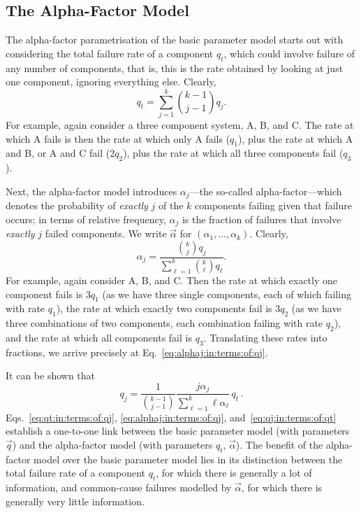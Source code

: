 \subsection{The Alpha-Factor Model}
\label{sec:alpha-factor-model}

The alpha-factor parametrisation of the basic parameter model
\parencite{1988:mosleh::common:cause} starts out with
considering the total failure rate of a component $q_t$,
which could involve failure of any number of components,
that is, this is the rate obtained by looking at just one component,
ignoring everything else.
Clearly,
\begin{equation}\label{eq:qt:in:terms:of:qj}
  q_t=\sum_{j=1}^k\binom{k-1}{j-1}q_j.
\end{equation}
For example, again consider a three component system, A, B, and C.
The rate at which A fails is then
the rate at which only A fails ($q_1$),
plus the rate at which A and B, or A and C fail ($2q_2$),
plus the rate at which all three components fail ($q_3$).

Next, the alpha-factor model introduces
$\alpha_j$---the so-called alpha-factor---which
denotes the probability of \emph{exactly} $j$ of the $k$ components
failing given that failure occurs;
in terms of relative frequency,
$\alpha_j$ is the fraction of failures
that involve \emph{exactly} $j$ failed components.
We write $\vec{\alpha}$ for $(\alpha_1,\dots,\alpha_k)$.
Clearly,
\begin{equation}\label{eq:alphaj:in:terms:of:qj}
  \alpha_j=\frac{\binom{k}{j}q_j}{\sum_{\ell=1}^k\binom{k}{\ell}q_\ell}.
\end{equation}
For example, again consider A, B, and C.
Then the rate at which exactly one component fails is $3q_1$
(as we have three single components, each of which failing with rate $q_1$),
the rate at which exactly two components fail is $3q_2$
(as we have three combinations of two components,
each combination failing with rate $q_2$),
and the rate at which all components fail is $q_3$.
Translating these rates into fractions,
we arrive precisely at Eq.~\eqref{eq:alphaj:in:terms:of:qj}.

It can be shown that \parencite[e.g.,][p.~C-10f]{1988:mosleh::common:cause} %
\begin{equation}\label{eq:qj:in:terms:of:qt}
  q_j=\frac{1}{\binom{k-1}{j-1}}\frac{j\alpha_j}{\sum_{\ell=1}^k \ell\alpha_\ell}\,q_t\,.
\end{equation}
Eqs.~\eqref{eq:qt:in:terms:of:qj}, \eqref{eq:alphaj:in:terms:of:qj},
and~\eqref{eq:qj:in:terms:of:qt}
establish a one-to-one link between the basic parameter model (with parameters $\vec{q}$)
and the alpha-factor model (with parameters $q_t$, $\vec{\alpha}$).
The benefit of the alpha-factor model over the basic parameter model
lies in its distinction between the total failure rate of a component $q_t$,
for which there is generally a lot of information,
and common-cause failures modelled by $\vec{\alpha}$,
for which there is generally very little information.

